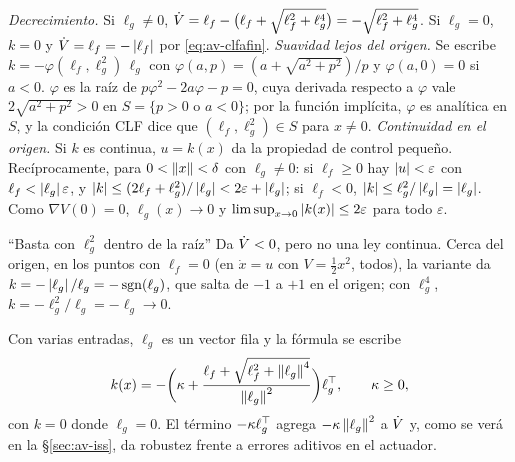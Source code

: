 \begin{demostracion}
\emph{Decrecimiento.} Si $\ell_g\neq0$, $\dot V=\ell_f-\bigl(\ell_f+\sqrt{\ell_f^2+\ell_g^4}\bigr)=-\sqrt{\ell_f^2+\ell_g^4}$. Si $\ell_g=0$, $k=0$ y $\dot V=\ell_f=-\left\lvert \ell_f\right\rvert$ por \eqref{eq:av-clfafin}.
\emph{Suavidad lejos del origen.} Se escribe $k=-\varphi(\ell_f,\ell_g^2)\,\ell_g$ con $\varphi(a,p)=(a+\sqrt{a^2+p^2})/p$ y $\varphi(a,0)=0$ si $a<0$. $\varphi$ es la raíz de $p\varphi^2-2a\varphi-p=0$, cuya derivada respecto a $\varphi$ vale $2\sqrt{a^2+p^2}>0$ en $S=\{p>0\text{ o }a<0\}$; por la función implícita, $\varphi$ es analítica en $S$, y la condición CLF dice que $(\ell_f,\ell_g^2)\in S$ para $x\neq0$.
\emph{Continuidad en el origen.} Si $k$ es continua, $u=k(x)$ da la propiedad de control pequeño. Recíprocamente, para $0<\left\lVert x\right\rVert<\delta$ con $\ell_g\neq0$: si $\ell_f\ge0$ hay $\left\lvert u\right\rvert<\varepsilon$ con $\ell_f<\left\lvert \ell_g\right\rvert\varepsilon$, y $\left\lvert k\right\rvert\le(2\ell_f+\ell_g^2)/\left\lvert \ell_g\right\rvert<2\varepsilon+\left\lvert \ell_g\right\rvert$; si $\ell_f<0$, $\left\lvert k\right\rvert\le\ell_g^2/\left\lvert \ell_g\right\rvert=\left\lvert \ell_g\right\rvert$. Como $\nabla V(0)=0$, $\ell_g(x)\to0$ y $\limsup_{x\to0}\left\lvert k(x)\right\rvert\le2\varepsilon$ para todo $\varepsilon$.
\end{demostracion}

\begin{trampa}[label=tr:av-cuarta]{``Basta con $\ell_g^2$ dentro de la raíz''}
Da $\dot V<0$, pero no una ley continua. Cerca del origen, en los puntos con $\ell_f=0$ (en $\dot x=u$ con $V=\tfrac12x^2$, todos), la variante da $k=-\left\lvert \ell_g\right\rvert/\ell_g=-\operatorname{sgn}(\ell_g)$, que salta de $-1$ a $+1$ en el origen; con $\ell_g^4$, $k=-\ell_g^2/\ell_g=-\ell_g\to0$.
\end{trampa}

Con varias entradas, $\ell_g$ es un vector fila y la fórmula se escribe \citep[ec.~(9.10)]{KeBr23}
\begin{equation}
  k(x)=-\biggl(\kappa+\frac{\ell_f+\sqrt{\ell_f^2+\left\lVert \ell_g\right\rVert^4}}{\left\lVert \ell_g\right\rVert^2}\biggr)\ell_g^{\top},\qquad\kappa\ge0,
  \label{eq:av-sontagvec}
\end{equation}
con $k=0$ donde $\ell_g=0$. El término $-\kappa\ell_g^{\top}$ agrega $-\kappa\left\lVert \ell_g\right\rVert^2$ a $\dot V$ y, como se verá en la \S\ref{sec:av-iss}, da robustez frente a errores aditivos en el actuador.

